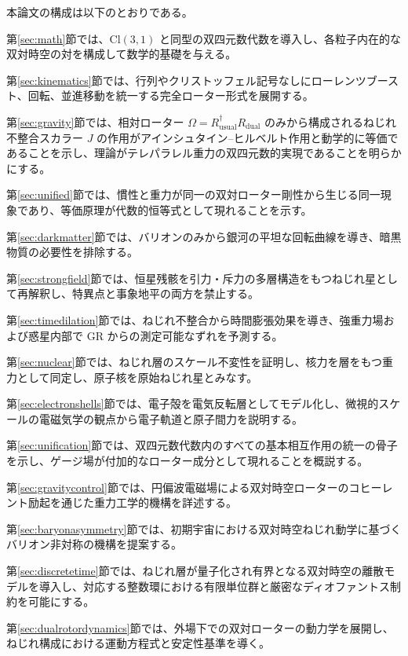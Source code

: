 \documentclass[a4paper]{article}
\begin{document}
本論文の構成は以下のとおりである。

第\ref{sec:math}節では、$\mathrm{Cl}(3,1)$ と同型の双四元数代数を導入し、各粒子内在的な双対時空の対を構成して数学的基礎を与える。

第\ref{sec:kinematics}節では、行列やクリストッフェル記号なしにローレンツブースト、回転、並進移動を統一する完全ローター形式を展開する。

第\ref{sec:gravity}節では、相対ローター $\Omega = R_\text{usual}^\dagger R_{\text{dual}}$ のみから構成されるねじれ不整合スカラー $J$ の作用がアインシュタイン--ヒルベルト作用と動学的に等価であることを示し、理論がテレパラレル重力の双四元数的実現であることを明らかにする。

第\ref{sec:unified}節では、慣性と重力が同一の双対ローター剛性から生じる同一現象であり、等価原理が代数的恒等式として現れることを示す。

第\ref{sec:darkmatter}節では、バリオンのみから銀河の平坦な回転曲線を導き、暗黒物質の必要性を排除する。

第\ref{sec:strongfield}節では、恒星残骸を引力・斥力の多層構造をもつねじれ星として再解釈し、特異点と事象地平の両方を禁止する。

第\ref{sec:timedilation}節では、ねじれ不整合から時間膨張効果を導き、強重力場および惑星内部で GR からの測定可能なずれを予測する。

第\ref{sec:nuclear}節では、ねじれ層のスケール不変性を証明し、核力を層をもつ重力として同定し、原子核を原始ねじれ星とみなす。

第\ref{sec:electronshells}節では、電子殻を電気反転層としてモデル化し、微視的スケールの電磁気学の観点から電子軌道と原子間力を説明する。

第\ref{sec:unification}節では、双四元数代数内のすべての基本相互作用の統一の骨子を示し、ゲージ場が付加的なローター成分として現れることを概説する。

第\ref{sec:gravitycontrol}節では、円偏波電磁場による双対時空ローターのコヒーレント励起を通じた重力工学的機構を詳述する。

第\ref{sec:baryonasymmetry}節では、初期宇宙における双対時空ねじれ動学に基づくバリオン非対称の機構を提案する。

第\ref{sec:discretetime}節では、ねじれ層が量子化され有界となる双対時空の離散モデルを導入し、対応する整数環における有限単位群と厳密なディオファントス制約を可能にする。

第\ref{sec:dualrotordynamics}節では、外場下での双対ローターの動力学を展開し、ねじれ構成における運動方程式と安定性基準を導く。
\end{document}
